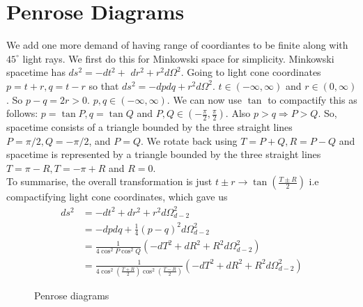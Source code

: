 ﻿\documentclass[12pt,a4paper]{article}
\begin{document}
\section{Penrose Diagrams}
We add one more demand of having range of coordiantes to be finite along with $45^{\circ}$ light rays. We first do this for Minkowski space for simplicity. Minkowski spacetime has $d s^{2}=-d t^{2}+$ $d r^{2}+r^{2} d \Omega^{2}$. Going to light cone coordinates $p=t+r, q=t-r$ so that $d s^{2}=-d p d q+r^{2} d \Omega^{2}$. $t \in (-\infty,\infty)$ and $r \in (0,\infty)$. So $p-q=2 r>0$. $p,q \in (-\infty,\infty)$. We can now use $\tan$ to compactify this as follows: $p=\tan P, q=\tan Q$ and $P, Q\in \left(-\frac{\pi}{2}, \frac{\pi}{2}\right)$. Also $p>q \Rightarrow P>Q$. So, spacetime consists of a triangle bounded by the three straight lines $P=\pi / 2, Q=-\pi / 2$, and $P=Q$. We rotate back using $T=P+Q, R=P-Q$ and spacetime is represented by a triangle bounded by the three straight lines $T=\pi-R, T=-\pi+R$ and $R=0$. \\
To summarise, the overall transformation is just $t\pm r \rightarrow \tan(\frac{T\pm R}{2})$ i.e compactifying light cone coordinates, which gave us
$$
\begin{aligned}
d s^{2} &=-d t^{2}+d r^{2}+r^{2} d \Omega_{d-2}^{2} \\
&=-d p d q+\frac{1}{4}(p-q)^{2} d \Omega_{d-2}^{2} \\
&=\frac{1}{4 \cos ^{2} P \cos ^{2} Q}\left(-d T^{2}+d R^{2}+R^{2} d \Omega_{d-2}^{2}\right)\\
&=\frac{1}{4 \cos ^{2} (\frac{T+R}{2}) \cos ^{2} (\frac{T-R}{2})}\left(-d T^{2}+d R^{2}+R^{2} d \Omega_{d-2}^{2}\right)
\end{aligned}
$$
\begin{figure}[H]
    \centering
    \qquad
    \caption{Penrose diagrams}
    \label{fig:example}
\end{figure}
\end{document}

